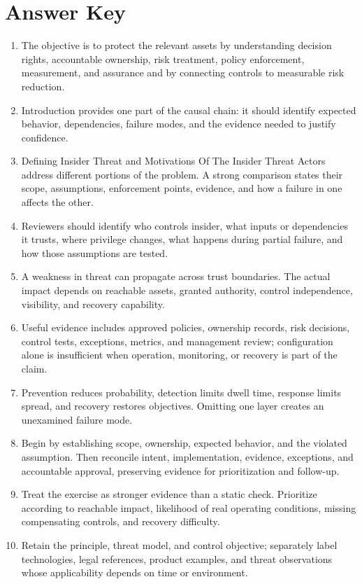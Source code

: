 \documentclass[11pt]{article}
\begin{document}
\section*{Answer Key}
\begin{enumerate}
\item The objective is to protect the relevant assets by understanding decision rights, accountable ownership, risk treatment, policy enforcement, measurement, and assurance and by connecting controls to measurable risk reduction.
\item Introduction provides one part of the causal chain: it should identify expected behavior, dependencies, failure modes, and the evidence needed to justify confidence.
\item Defining Insider Threat and Motivations Of The Insider Threat Actors address different portions of the problem. A strong comparison states their scope, assumptions, enforcement points, evidence, and how a failure in one affects the other.
\item Reviewers should identify who controls insider, what inputs or dependencies it trusts, where privilege changes, what happens during partial failure, and how those assumptions are tested.
\item A weakness in threat can propagate across trust boundaries. The actual impact depends on reachable assets, granted authority, control independence, visibility, and recovery capability.
\item Useful evidence includes approved policies, ownership records, risk decisions, control tests, exceptions, metrics, and management review; configuration alone is insufficient when operation, monitoring, or recovery is part of the claim.
\item Prevention reduces probability, detection limits dwell time, response limits spread, and recovery restores objectives. Omitting one layer creates an unexamined failure mode.
\item Begin by establishing scope, ownership, expected behavior, and the violated assumption. Then reconcile intent, implementation, evidence, exceptions, and accountable approval, preserving evidence for prioritization and follow-up.
\item Treat the exercise as stronger evidence than a static check. Prioritize according to reachable impact, likelihood of real operating conditions, missing compensating controls, and recovery difficulty.
\item Retain the principle, threat model, and control objective; separately label technologies, legal references, product examples, and threat observations whose applicability depends on time or environment.
\end{enumerate}
\end{document}
